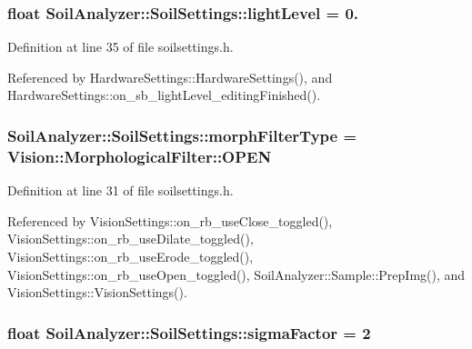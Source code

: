\subsubsection[{light\+Level}]{\setlength{\rightskip}{0pt plus 5cm}float Soil\+Analyzer\+::\+Soil\+Settings\+::light\+Level = 0.}\label{class_soil_analyzer_1_1_soil_settings_aa4d3ed8c1ab6551bfa4763e8a1ffc148}


Definition at line 35 of file soilsettings.\+h.



Referenced by Hardware\+Settings\+::\+Hardware\+Settings(), and Hardware\+Settings\+::on\+\_\+sb\+\_\+light\+Level\+\_\+editing\+Finished().

\hypertarget{class_soil_analyzer_1_1_soil_settings_ad1420c4800badb3eb07eba4767e3df81}{}
\subsubsection[{morph\+Filter\+Type}]{ Soil\+Analyzer\+::\+Soil\+Settings\+::morph\+Filter\+Type = {\bf Vision\+::\+Morphological\+Filter\+::\+O\+P\+E\+N}}\label{class_soil_analyzer_1_1_soil_settings_ad1420c4800badb3eb07eba4767e3df81}


Definition at line 31 of file soilsettings.\+h.



Referenced by Vision\+Settings\+::on\+\_\+rb\+\_\+use\+Close\+\_\+toggled(), Vision\+Settings\+::on\+\_\+rb\+\_\+use\+Dilate\+\_\+toggled(), Vision\+Settings\+::on\+\_\+rb\+\_\+use\+Erode\+\_\+toggled(), Vision\+Settings\+::on\+\_\+rb\+\_\+use\+Open\+\_\+toggled(), Soil\+Analyzer\+::\+Sample\+::\+Prep\+Img(), and Vision\+Settings\+::\+Vision\+Settings().

\hypertarget{class_soil_analyzer_1_1_soil_settings_a97e62512e12a2ba9210fd93950b6e717}{}
\subsubsection[{sigma\+Factor}]{\setlength{\rightskip}{0pt plus 5cm}float Soil\+Analyzer\+::\+Soil\+Settings\+::sigma\+Factor = 2}\label{class_soil_analyzer_1_1_soil_settings_a97e62512e12a2ba9210fd93950b6e717}


